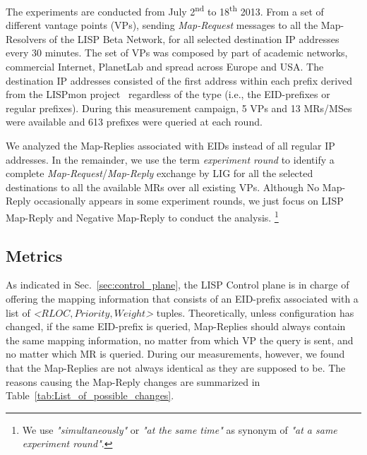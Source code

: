The experiments are conducted from July 2\textsuperscript{nd} to 18\textsuperscript{th} 2013. From a set of different vantage points (VPs), sending \emph{Map-Request} messages to all the Map-Resolvers of the LISP Beta Network, for all selected destination IP addresses every 30 minutes. The set of VPs was composed by part of academic networks, commercial Internet, PlanetLab and spread across Europe and USA. The destination IP addresses consisted of the first address within each prefix derived from the LISPmon project~\cite{lispmon} regardless of the type (i.e., the EID-prefixes or regular prefixes). During this measurement campaign, 5 VPs and 13 MRs/MSes were available and 613 prefixes were queried at each round. 

We analyzed the Map-Replies associated with EIDs instead of all regular IP addresses. In the remainder, we use the term \emph{experiment round} to
identify a complete \emph{Map-Request}/\emph{Map-Reply} exchange by LIG for all the selected destinations to all the available MRs over all existing VPs. Although No Map-Reply occasionally appears in some experiment rounds, we just focus on LISP Map-Reply and Negative Map-Reply to conduct the analysis. \footnote{We use \emph{"simultaneously"} or \emph{"at the same
time"} as synonym of \emph{"at a same experiment round"}.}


\subsection{Metrics}
\label{mds_metrics}
As indicated in Sec.~\ref{sec:control_plane}, the LISP Control plane is in charge of offering the mapping information that consists of an EID-prefix associated with a list of \emph{<$RLOC, Priority, Weight$>} tuples. Theoretically, unless configuration has changed, if the same EID-prefix is queried, Map-Replies should always contain the same mapping information, no matter from which VP the query is sent, and no matter which MR is queried. During our measurements, however, we found that the Map-Replies are not always identical as they are supposed to be. The reasons causing the Map-Reply changes are summarized in Table~\ref{tab:List_of_possible_changes}. 

